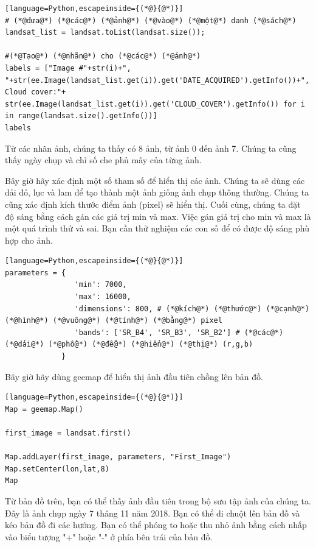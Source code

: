\begin{lstlisting}[language=Python,escapeinside={(*@}{@*)}]
# (*@đưa@*) (*@các@*) (*@ảnh@*) (*@vào@*) (*@một@*) danh (*@sách@*)
landsat_list = landsat.toList(landsat.size());

#(*@Tạo@*) (*@nhãn@*) cho (*@các@*) (*@ảnh@*)
labels = ["Image #"+str(i)+", "+str(ee.Image(landsat_list.get(i)).get('DATE_ACQUIRED').getInfo())+", Cloud cover:"+ str(ee.Image(landsat_list.get(i)).get('CLOUD_COVER').getInfo()) for i in range(landsat.size().getInfo())]
labels
\end{lstlisting}

Từ các nhãn ảnh, chúng ta thấy có 8 ảnh, từ ảnh 0 đến ảnh 7. Chúng ta cũng thấy ngày chụp và chỉ số che phủ mây của từng ảnh.

Bây giờ hãy xác định một số tham số để hiển thị các ảnh. Chúng ta sẽ dùng các dải đỏ, lục và lam để tạo thành một ảnh giống ảnh chụp thông thường. Chúng ta cũng xác định kích thước điểm ảnh (pixel) sẽ hiển thị. Cuối cùng, chúng ta đặt độ sáng bằng cách gán các giá trị min và max. Việc gán giá trị cho min và max là một quá trình thử và sai. Bạn cần thử nghiệm các con số để có được độ sáng phù hợp cho ảnh.

\begin{lstlisting}[language=Python,escapeinside={(*@}{@*)}]
parameters = {
                'min': 7000,
                'max': 16000,
                'dimensions': 800, # (*@kích@*) (*@thước@*) (*@cạnh@*) (*@hình@*) (*@vuông@*) (*@tính@*) (*@bằng@*) pixel
                'bands': ['SR_B4', 'SR_B3', 'SR_B2'] # (*@các@*) (*@dải@*) (*@phổ@*) (*@để@*) (*@hiển@*) (*@thị@*) (r,g,b)
             }
\end{lstlisting}

Bây giờ hãy dùng geemap để hiển thị ảnh đầu tiên chồng lên bản đồ.

\begin{lstlisting}[language=Python,escapeinside={(*@}{@*)}]
Map = geemap.Map()

first_image = landsat.first()

Map.addLayer(first_image, parameters, "First_Image")
Map.setCenter(lon,lat,8)
Map
\end{lstlisting}

Từ bản đồ trên, bạn có thể thấy ảnh đầu tiên trong bộ sưu tập ảnh của chúng ta. Đây là ảnh chụp ngày 7 tháng 11 năm 2018. Bạn có thể di chuột lên bản đồ và kéo bản đồ đi các hướng. Bạn có thể phóng to hoặc thu nhỏ ảnh bằng cách nhấp vào biểu tượng "+" hoặc "-" ở phía bên trái của bản đồ.


